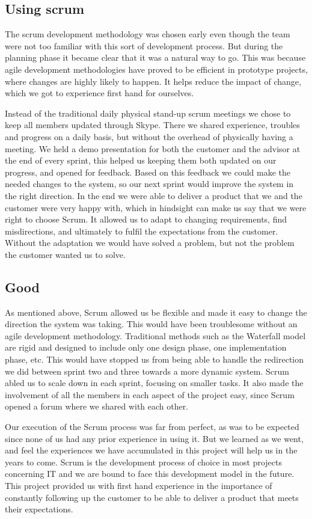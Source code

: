 \subsection*{Using scrum}
The scrum development methodology was chosen early even though the team were not too familiar with this sort of development process. But during the planning phase it became clear that it was a natural way to go. This was because agile development methodologies have proved to be efficient in prototype projects, where changes are highly likely to happen. It helps reduce the impact of change, which we got to experience first hand for ourselves. 

Instead of the traditional daily physical stand-up scrum meetings we chose to keep all members updated through Skype. There we shared experience, troubles and progress on a daily basis, but without the overhead of physically having a meeting. We held a demo presentation for both the customer and the advisor at the end of every sprint, this helped us keeping them both updated on our progress, and opened for feedback. Based on this feedback we could make the needed changes to the system, so our next sprint would improve the system in the right direction. In the end we were able to deliver a product that we and the customer were very happy with, which in hindsight can make us say that we were right to choose Scrum. It allowed us to adapt to changing requirements, find misdirections, and ultimately to fulfil the expectations from the customer. Without the adaptation we would have solved a problem, but not the problem the customer wanted us to solve.

\subsection*{Good}
As mentioned above, Scrum allowed us be flexible and made it easy to change the direction the system was taking. This would have been troublesome without an agile development methodology. Traditional methods such as the Waterfall model are rigid and designed to include only one design phase, one implementation phase, etc. This would have stopped us from being able to handle the redirection we did between sprint two and three towards a more dynamic system. Scrum abled us to scale down in each sprint, focusing on smaller tasks. It also made the involvement of all the members in each aspect of the project easy, since Scrum opened a forum where we shared with each other. 

Our execution of the Scrum process was far from perfect, as was to be expected since none of us had any prior experience in using it. But we learned as we went, and feel the experiences we have accumulated in this project will help us in the years to come. Scrum is the development process of choice in most projects concerning IT and we are bound to face this development model in the future. This project provided us with first hand experience in the importance of constantly following up the customer to be able to deliver a product that meets their expectations.

